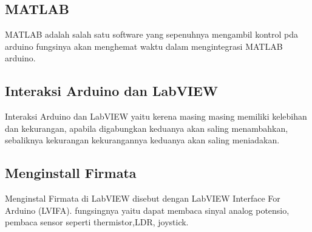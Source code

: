 	\subsection{MATLAB}
	MATLAB adalah salah satu software yang sepenuhnya mengambil kontrol pda arduino fungsinya akan menghemat waktu dalam mengintegrasi MATLAB arduino.
	
	\subsection{Interaksi Arduino dan LabVIEW}
	Interaksi Arduino dan LabVIEW yaitu kerena masing masing memiliki kelebihan dan kekurangan, apabila digabungkan keduanya akan saling menambahkan,
	sebaliknya kekurangan kekurangannya keduanya akan saling meniadakan.
	
	\subsection{Menginstall Firmata}
	Menginstal Firmata di LabVIEW disebut dengan LabVIEW Interface For Arduino (LVIFA). fungsingnya yaitu dapat membaca sinyal analog potensio,
	pembaca sensor seperti thermistor,LDR, joystick.
	
	